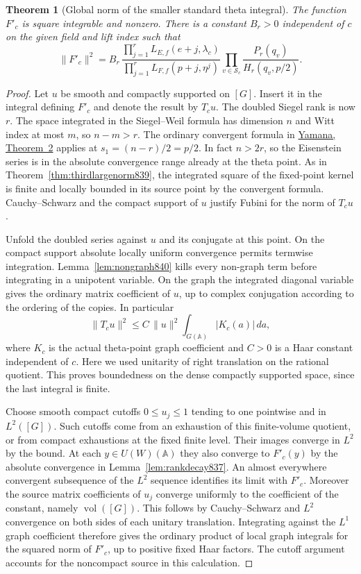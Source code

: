 \documentclass[a4paper,11pt]{article}
\newtheorem{theorem}[proposition]{Theorem}
\theoremstyle{definition}
\theoremstyle{remark}
\numberwithin{equation}{section}
\begin{document}
\begin{theorem}[Global norm of the smaller standard theta integral]
\leavevmode\label{thm:thirdsmallnorm840}
The function \(F'_c\) is square integrable and nonzero.
There is a constant \(B_r>0\) independent of \(c\) on the
given field and lift index such that
\[
 \|F'_c\|^2=
 B_r\,
 \frac{\displaystyle\prod_{j=1}^{r} L_{E,f}(e+j,\lambda_c)}
      {\displaystyle\prod_{j=1}^{r} L_{F,f}(p+j,\eta^j)}
       \prod_{v\in\mathcal S_c}
                     \frac{P_r(q_v)}{H_r(q_v,p/2)} .
\]
\end{theorem}
\begin{proof}
Let \(u\) be smooth and compactly supported on \([G]\).
Insert it in the integral defining \(F'_c\) and denote the
result by \(T_c u\). The doubled Siegel rank is now \(r\).
The space integrated in the Siegel--Weil formula has
dimension \(n\) and Witt index at most \(m\), so
\(n-m>r\). The ordinary convergent formula in
\href{https://msp.org/pjm/2013/264-1/pjm-v264-n1-p11-s.pdf}
{Yamana, Theorem~2} applies at \(s_1=(n-r)/2=p/2\).
In fact \(n>2r\), so the Eisenstein series is in the
absolute convergence range already at the theta point.
As in Theorem~\ref{thm:thirdlargenorm839}, the integrated
square of the fixed-point kernel is finite and locally
bounded in its source point by the convergent formula.
Cauchy--Schwarz and the compact support of \(u\) justify
Fubini for the norm of \(T_cu\).

Unfold the doubled series against \(u\) and its conjugate
at this point. On the compact support absolute locally
uniform convergence permits termwise integration.
Lemma~\ref{lem:nongraph840} kills every non-graph term
before integrating in a unipotent variable. On the graph
the integrated diagonal variable gives the ordinary matrix
coefficient of \(u\), up to complex conjugation according
to the ordering of the copies. In particular
\[
    \|T_cu\|^2\le C\,\|u\|^2\int_{G(\mathbb A)}|K_c(a)|\,da,
\]
where \(K_c\) is the actual theta-point graph coefficient
and \(C>0\) is a Haar constant independent of \(c\). Here
we used unitarity of right translation on the rational
quotient. This proves boundedness on the dense compactly
supported space, since the last integral is finite.

Choose smooth compact cutoffs \(0\le u_j\le1\) tending to
one pointwise and in \(L^2([G])\). Such cutoffs come from an
exhaustion of this finite-volume quotient, or from compact
exhaustions at the fixed finite level. Their images converge
in \(L^2\) by the bound. At each \(y\in U(W)(\mathbb A)\)
they also converge to \(F'_c(y)\) by the absolute convergence
in Lemma~\ref{lem:rankdecay837}. An almost everywhere
convergent subsequence of the \(L^2\) sequence identifies
its limit with \(F'_c\). Moreover the source matrix
coefficients of \(u_j\) converge uniformly to the coefficient
of the constant, namely \(\operatorname{vol}([G])\).
This follows by Cauchy--Schwarz and \(L^2\) convergence on
both sides of each unitary translation. Integrating against
the \(L^1\) graph coefficient therefore gives the ordinary
product of local graph integrals for the squared norm of
\(F'_c\), up to positive fixed Haar factors. The cutoff
argument accounts for the noncompact source in this calculation.


\end{proof}
\end{document}
